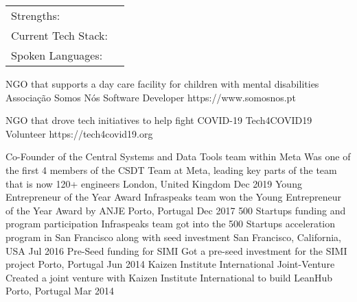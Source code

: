 \documentclass[]{awesome-cv}
\begin{document}
\vspace{-6mm}
\begin{cventries}
	\vspace{-2mm}
	\cventry
	{}
	{\def\arraystretch{1.15}{\begin{tabular}{ l l }
		Strengths:  & {\skill{ Builder, Problem Solver, Outside-the-box Thinking, Coach, Self-Motivated, "Do-it" Attitude }} \\
		Current Tech Stack:  & {\skill{ Hack, PHP, React, Javascript, GraphQL, Relay (Full-Stack Eng) }} \\
		Spoken Languages:  & {\skill{ English, Portuguese, French, Spanish, Slovene}} \\
		\end{tabular}}}
	{}
	{}
	{}
\end{cventries}

\vspace{-10mm}

\vspace{-3mm}
\begin{cventries}
 	\cventry
	{NGO that supports a day care facility for children with mental disabilities}
	{Associação Somos Nós}
	{Software Developer}
	{https://www.somosnos.pt}
	{}

	\vspace{-7mm}
	\cventry
	{NGO that drove tech initiatives to help fight COVID-19}
	{Tech4COVID19}
	{Volunteer}
	{https://tech4covid19.org}
	{}

	\vspace{-5mm}
\end{cventries}
\begin{cvhonors}
	\cvhonor
	{Co-Founder of the Central Systems and Data Tools team within Meta}
	{Was one of the first 4 members of the CSDT Team at Meta, leading key parts of the team that is now 120+ engineers}
	{London, United Kingdom}
	{Dec 2019}
	\cvhonor
	{Young Entrepreneur of the Year Award}
	{Infraspeak\textquotesingle{}s team won the Young Entrepreneur of the Year Award by ANJE}
	{Porto, Portugal}
	{Dec 2017}
	\cvhonor
	{500 Startups funding and program participation}
	{Infraspeak\textquotesingle{}s team got into the 500 Startups acceleration program in San Francisco along with seed investment}
	{San Francisco, California, USA}
	{Jul 2016}
	\cvhonor
	{Pre-Seed funding for SIMI}
	{Got a pre-seed investment for the SIMI project}
	{Porto, Portugal}
	{Jun 2014}
	\cvhonor
	{Kaizen Institute International Joint-Venture}
	{Created a joint venture with Kaizen Institute International to build LeanHub}
	{Porto, Portugal}
	{Mar 2014}
\end{cvhonors}
\
\end{document}
